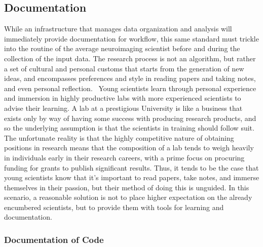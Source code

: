 \documentclass{report}
\begin{document}
\subsection{Documentation}

While an infrastructure that manages data organization and analysis will
immediately provide documentation for workflow, this same standard must
trickle into the routine of the average neuroimaging scientist before
and during the collection of the input data. The research process is not
an algorithm, but rather a set of cultural and personal customs that
starts from the generation of new ideas, and encompasses preferences and
style in reading papers and taking notes, and even personal reflection.
~Young scientists learn through personal experience and immersion in
highly productive labs with more experienced scientists to advise their
learning. A lab at a prestigious University is like a business that
exists only by way of having some success with producing research
products, and so the underlying assumption is that the scientists in
training should follow suit. The unfortunate reality is that the highly
competitive nature of obtaining positions in research means that the
composition of a lab tends to weigh heavily in individuals early in
their research careers, with a prime focus on procuring funding for
grants to publish significant results. Thus, it tends to be the case
that young scientists know that it's important to read papers, take
notes, and immerse themselves in their passion, but their method of
doing this is unguided. In this scenario, a reasonable solution is not
to place higher expectation on the already encumbered scientists, but to
provide them with tools for learning and documentation.

\subsubsection{Documentation of Code}
\end{document}
